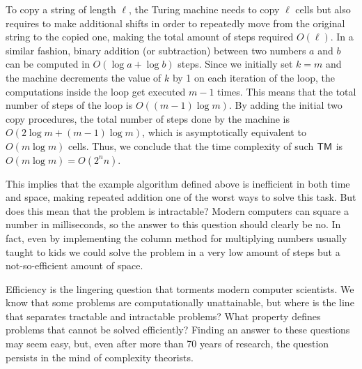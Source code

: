  To copy a string of length $\ell$, the Turing machine needs to copy $\ell$ cells but also requires to make additional shifts in order to repeatedly move from the original string to the copied one, making the total amount of steps required $O(\ell)$. In a similar fashion, binary addition (or subtraction) between two numbers $a$ and $b$ can be computed in $O(\log a + \log b)$ steps. Since we initially set $k = m$ and the machine decrements the value of $k$ by 1 on each iteration of the loop, the computations inside the loop get executed $m-1$ times. This means that the total number of steps of the loop is $O((m-1) \log m)$. By adding the initial two copy procedures, the total number of steps done by the machine is $O(2 \log m + (m-1) \log m)$, which is asymptotically equivalent to $O(m \log m)$ cells. Thus, we conclude that the time complexity of such $\textsf{TM}$ is $O(m \log m) = O(2^n n)$.
    
 This implies that the example algorithm defined above is inefficient in both time and space, making repeated addition one of the worst ways to solve this task. But does this mean that the problem is intractable? Modern computers can square a number in milliseconds, so the answer to this question should clearly be no. In fact, even by implementing the column method for multiplying numbers usually taught to kids we could solve the problem in a very low amount of steps but a not-so-efficient amount of space.

    
 Efficiency is the lingering question that torments modern computer scientists. We know that some problems are computationally unattainable, but where is the line that separates tractable and intractable problems? What property defines problems that cannot be solved efficiently? Finding an answer to these questions may seem easy, but, even after more than 70 years of research, the question persists in the mind of complexity theorists.

\cleardoublepage